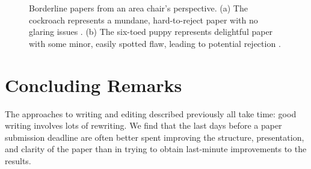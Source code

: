 \begin{figure}
    \centerline{
    }
    \caption{Borderline papers from an area chair's perspective. (a) The cockroach represents a mundane, hard-to-reject paper with no glaring issues \cite{cockroach}. (b) The six-toed puppy represents delightful paper with some minor, easily spotted flaw, leading to potential rejection \cite{puppy}. }
    \label{fig:areachair}
\end{figure}

\section{Concluding Remarks}
The approaches to writing and editing described previously all take time:
good writing involves lots of rewriting.  We find that the last days before a paper submission deadline are often better spent improving the structure, presentation, and clarity of the paper than in trying to obtain last-minute improvements to the results.
